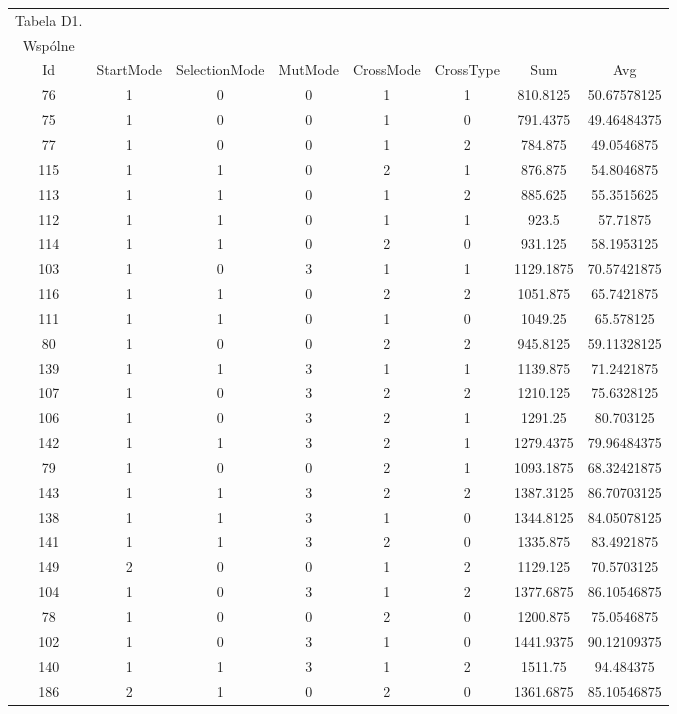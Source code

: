 \documentclass{article}
\begin{document}
\begin{table}[h!]
	\centering
	\begin{tabular}{c||c|c|c|c|c||c|c}
Tabela D1.\\
Wspólne\\
Id & StartMode & SelectionMode & MutMode & CrossMode & CrossType & Sum & Avg \\
\hline
76 & 1 & 0 & 0 & 1 & 1 & 810.8125 & 50.67578125 \\
75 & 1 & 0 & 0 & 1 & 0 & 791.4375 & 49.46484375 \\
77 & 1 & 0 & 0 & 1 & 2 & 784.875 & 49.0546875 \\
115 & 1 & 1 & 0 & 2 & 1 & 876.875 & 54.8046875 \\
113 & 1 & 1 & 0 & 1 & 2 & 885.625 & 55.3515625 \\
112 & 1 & 1 & 0 & 1 & 1 & 923.5 & 57.71875 \\
114 & 1 & 1 & 0 & 2 & 0 & 931.125 & 58.1953125 \\
103 & 1 & 0 & 3 & 1 & 1 & 1129.1875 & 70.57421875 \\
116 & 1 & 1 & 0 & 2 & 2 & 1051.875 & 65.7421875 \\
111 & 1 & 1 & 0 & 1 & 0 & 1049.25 & 65.578125 \\
80 & 1 & 0 & 0 & 2 & 2 & 945.8125 & 59.11328125 \\
139 & 1 & 1 & 3 & 1 & 1 & 1139.875 & 71.2421875 \\
107 & 1 & 0 & 3 & 2 & 2 & 1210.125 & 75.6328125 \\
106 & 1 & 0 & 3 & 2 & 1 & 1291.25 & 80.703125 \\
142 & 1 & 1 & 3 & 2 & 1 & 1279.4375 & 79.96484375 \\
79 & 1 & 0 & 0 & 2 & 1 & 1093.1875 & 68.32421875 \\
143 & 1 & 1 & 3 & 2 & 2 & 1387.3125 & 86.70703125 \\
138 & 1 & 1 & 3 & 1 & 0 & 1344.8125 & 84.05078125 \\
141 & 1 & 1 & 3 & 2 & 0 & 1335.875 & 83.4921875 \\
149 & 2 & 0 & 0 & 1 & 2 & 1129.125 & 70.5703125 \\
104 & 1 & 0 & 3 & 1 & 2 & 1377.6875 & 86.10546875 \\
78 & 1 & 0 & 0 & 2 & 0 & 1200.875 & 75.0546875 \\
102 & 1 & 0 & 3 & 1 & 0 & 1441.9375 & 90.12109375 \\
140 & 1 & 1 & 3 & 1 & 2 & 1511.75 & 94.484375 \\
186 & 2 & 1 & 0 & 2 & 0 & 1361.6875 & 85.10546875 \\

\end{tabular}
\end{table}
\end{document}
